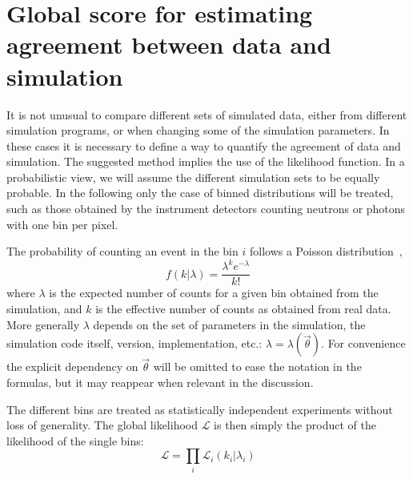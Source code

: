 \documentclass{article}
\newcommand{\Ell}{\ensuremath{\mathcal{L}}\xspace}
\begin{document}
\section{Global score for estimating agreement between data and
simulation}
\label{global-score-for-estimating-agreement-between-data-and-simulation}

It is not unusual to compare different sets of simulated data, either from different simulation programs, or when changing some of the simulation parameters. In these cases it is necessary to define a way to quantify the agreement of data and simulation. 
The suggested method implies the use of the likelihood function\cite{likelihood}.
In a probabilistic view, we will assume the different simulation sets to be equally probable.
In the following only the case of binned distributions will be treated, such as those obtained by the instrument detectors counting neutrons or photons with one bin per pixel.

The probability of counting an event in the bin $i$ follows a Poisson distribution~\cite{poisson},
\begin{equation}
    f(k|\lambda) = \frac{\lambda^k e^{-\lambda}}{k!} 
\end{equation}
where $\lambda$ is the expected number of counts for a given bin obtained from the simulation, and $k$ is the effective number of counts as obtained from real data.
More generally $\lambda$ depends on the set of parameters in the simulation, the simulation code itself, version, implementation, etc.: $\lambda = \lambda(\vec \theta)$. For convenience the explicit dependency on $\vec\theta$ will be omitted to ease the notation in the formulas, but it may reappear when relevant in the discussion.

The different bins are treated as statistically independent experiments without loss of generality. 
The global likelihood \Ell is then simply the product of the likelihood of the single bins:
\newcommand{\likelihood}{\ensuremath{\Ell_i(k_i|\lambda_i)}}
\begin{equation}
    \Ell = \prod_{i}{\likelihood}
\end{equation}

\end{document}
